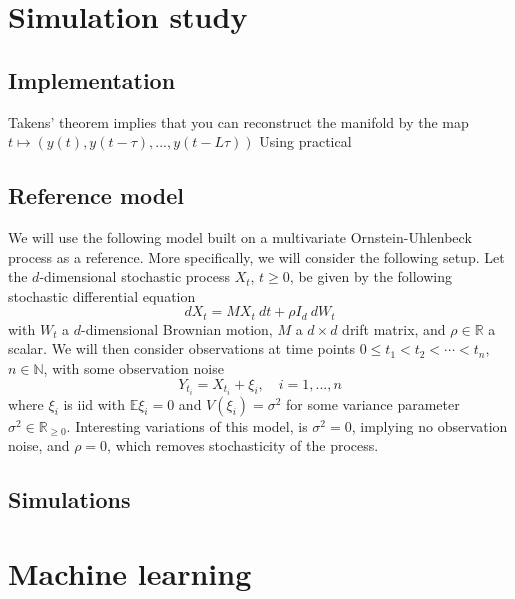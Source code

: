 \documentclass[11pt, a4paper]{memoir}
\theoremstyle{plain}
\theoremstyle{definition}
\begin{document}
\chapter{Simulation study}
\section{Implementation}
Takens' theorem implies that you can reconstruct the manifold by the map
$t\mapsto (y(t),y(t-\tau),...,y(t-L\tau))$
Using practical  
\section{Reference model}
We will use the following model built on a multivariate Ornstein-Uhlenbeck process as a reference. More specifically, we will consider the following setup. Let the $d$-dimensional stochastic process $X_t$, $t\geq 0$, be given by the following stochastic differential equation
$$dX_t=M X_t\ dt+\rho I_d\ dW_t$$
with $W_t$ a $d$-dimensional  Brownian motion, $M$ a $d\times d$ drift matrix, and $\rho\in \mathbb{R}$ a scalar. We will then consider observations at time points $0\leq t_1<t_2<\cdots <t_n$, $n\in \mathbb{N}$, with some observation noise
$$Y_{t_i}=X_{t_i}+\xi_i,\quad i=1,...,n$$
where $\xi_i$ is iid with $\mathbb{E} \xi_i=0$ and $V(\xi_i)=\sigma^2$ for some variance parameter $\sigma^2\in \mathbb{R}_{\geq 0}$. Interesting variations of this model, is $\sigma^2=0$, implying no observation noise, and $\rho=0$, which removes stochasticity of the process.


\section{Simulations}
 

\chapter{Machine learning}


\end{document}
